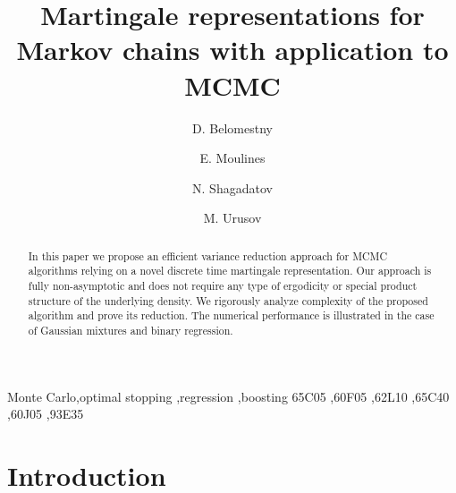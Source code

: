 \documentclass[article]{elsarticle}
\begin{document}
\begin{frontmatter}

\title{Martingale representations  for Markov chains   with application to MCMC }


\author[address1,address2]{D. Belomestny}

\author[address3,address2]{E. Moulines}
\author[address2]{N. Shagadatov}
\author[address1]{M. Urusov}


\address[address1]{Duisburg-Essen University, Essen}
\address[address2]{National University Higher School of Economics, Moscow}
\address[address3]{Centre de Math\'ematiques Appliqu\'ees, UMR 7641, Ecole Polytechnique, France}

\begin{abstract}
In this paper we propose an efficient variance reduction approach for  MCMC algorithms relying on a novel discrete time martingale representation. Our approach is fully non-asymptotic and does not require any type of ergodicity or special product structure of the underlying density.   We rigorously analyze   complexity of the proposed algorithm and prove its reduction. The numerical performance is illustrated  in the case of Gaussian mixtures and binary regression.
\end{abstract}

\begin{keyword}
Monte Carlo\sep optimal stopping \sep regression \sep boosting
\MSC[2010] 65C05 \sep 60F05 \sep 62L10 \sep 65C40 \sep 60J05 \sep 93E35

\end{keyword}

\end{frontmatter}

\linenumbers

\section{Introduction}
\end{document}
